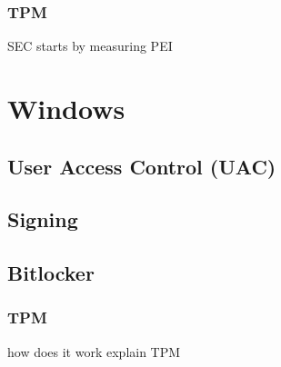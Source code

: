 \subsubsection{TPM}
SEC starts by measuring PEI

\section{Windows}
\subsection{User Access Control (UAC)}
\subsection{Signing}
\subsection{Bitlocker}
\subsubsection{TPM}
how does it work
explain TPM